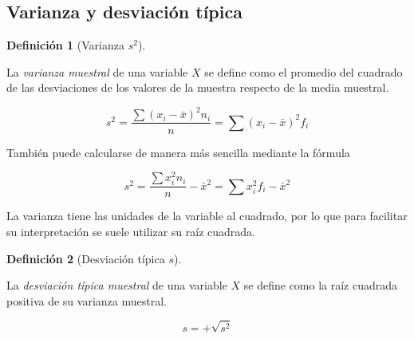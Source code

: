 \documentclass[
  spanish,
  a4paper,
]{scrreport}
\theoremstyle{plain}
\theoremstyle{definition}
\theoremstyle{definition}
\newtheorem{definition}{Definición}[chapter]
\theoremstyle{remark}
\begin{document}
\subsection{Varianza y desviación
típica}\label{varianza-y-desviaciuxf3n-tuxedpica}

\begin{definition}[Varianza
\(s^2\)]\protect\hypertarget{def-varianza}{}\label{def-varianza}

La \emph{varianza muestral} de una variable \(X\) se define como el
promedio del cuadrado de las desviaciones de los valores de la muestra
respecto de la media muestral.

\[s^2 = \frac{\sum (x_i-\bar x)^2n_i}{n} = \sum (x_i-\bar x)^2f_i\]

\end{definition}

También puede calcularse de manera más sencilla mediante la fórmula

\[s^2 = \frac{\sum x_i^2n_i}{n} -\bar x^2= \sum x_i^2f_i-\bar x^2\]

La varianza tiene las unidades de la variable al cuadrado, por lo que
para facilitar su interpretación se suele utilizar su raíz cuadrada.

\begin{definition}[Desviación típica
\(s\)]\protect\hypertarget{def-desviacion-tipica}{}\label{def-desviacion-tipica}

La \emph{desviación típica muestral} de una variable \(X\) se define
como la raíz cuadrada positiva de su varianza muestral.

\[s = +\sqrt{s^2}\]

\end{definition}
\end{document}
